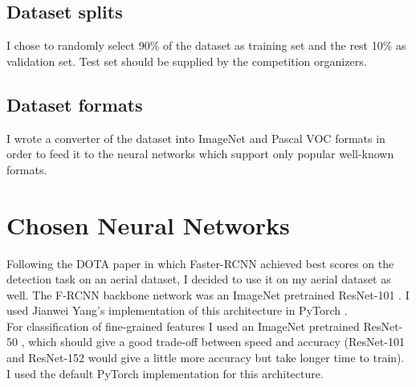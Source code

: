 \documentclass[]{article}
\begin{document}
\subsection{Dataset splits}
I chose to randomly select 90\% of the dataset as training set and the rest 10\% as validation set. Test set should be supplied by the competition organizers.\\


\subsection{Dataset formats}
I wrote a converter of the dataset into ImageNet \cite{imagenet} and Pascal VOC \cite{pascalvoc} formats in order to feed it to the neural networks which support only popular well-known formats.

\section{Chosen Neural Networks}
Following the DOTA paper \cite{dota} in which Faster-RCNN \cite{fasterrcnn} achieved best scores on the detection task on an aerial dataset, I decided to use it on my aerial dataset as well. The F-RCNN \cite{fasterrcnn} backbone network was an ImageNet \cite{imagenet} pretrained ResNet-101 \cite{resnet}. I used Jianwei Yang's implementation \cite{jianweiyang} of this architecture in PyTorch \cite{pytorch}.\\
For classification of fine-grained features I used an ImageNet \cite{imagenet} pretrained ResNet-50 \cite{resnet}, which should give a good trade-off between speed and accuracy (ResNet-101 and ResNet-152 would give a little more accuracy but take longer time to train). I used the default PyTorch \cite{pytorch} implementation for this architecture.
\end{document}
